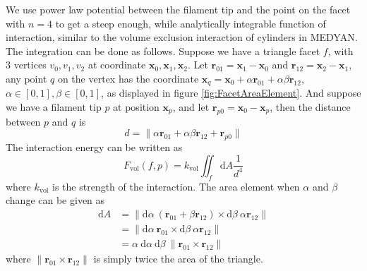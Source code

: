 \documentclass[main.tex]{subfiles}
\begin{document}
We use power law potential between the filament tip and the point on the facet with $n=4$ to get a steep enough, while analytically integrable function of interaction, similar to the volume exclusion interaction of cylinders in MEDYAN. The integration can be done as follows. Suppose we have a triangle facet $f$, with 3 vertices $v_0, v_1, v_2$ at coordinate $\bm{x}_0, \bm{x}_1, \bm{x}_2$. Let $\bm{r}_{01} = \bm{x}_1 - \bm{x}_0$ and $\bm{r}_{12} = \bm{x}_2 - \bm{x}_1$, any point $q$ on the vertex has the coordinate $\bm{x}_q = \bm{x}_0 + \alpha\bm{r}_{01} + \alpha\beta\bm{r}_{12}$, $\alpha\in[0,1], \beta\in[0,1]$, as displayed in figure \ref{fig:FacetAreaElement}. And suppose we have a filament tip $p$ at position $\bm{x}_p$, and let $\bm{r}_{p0} = \bm{x}_0 - \bm{x}_p$, then the distance between $p$ and $q$ is
\begin{equation}
d = \| \alpha\bm{r}_{01} + \alpha\beta\bm{r}_{12} + \bm{r}_{p0} \|
\end{equation}
The interaction energy can be written as
\begin{equation}
F_\text{vol}(f, p) = k_\text{vol} \iint_f \mathrm{d}A \frac1{d^4}
\label{eq:VolumeExclusionIntegral}
\end{equation}
where $k_\text{vol}$ is the strength of the interaction. The area element when $\alpha$ and $\beta$ change can be given as
\begin{equation}
\begin{aligned}
\mathrm{d}A &= \| \mathrm{d}\alpha\ \left(\bm{r}_{01} + \beta\bm{r}_{12}\right) \times \mathrm{d}\beta\ \alpha\bm{r}_{12} \|\\
&= \| \mathrm{d}\alpha\ \bm{r}_{01} \times \mathrm{d}\beta\ \alpha\bm{r}_{12} \|\\
&= \alpha\ \mathrm{d}\alpha\ \mathrm{d}\beta\ \| \bm{r}_{01} \times \bm{r}_{12} \|
\end{aligned}
\end{equation}
where $\| \bm{r}_{01} \times \bm{r}_{12} \|$ is simply twice the area of the triangle.
\end{document}
